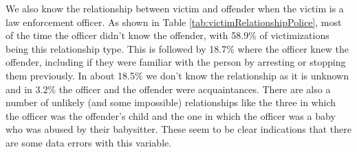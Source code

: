 \documentclass[
  12pt,
  openany]{book}
\begin{document}
We also know the relationship between victim and offender when the victim is a law enforcement officer. As shown in Table \ref{tab:victimRelationshipPolice}, most of the time the officer didn't know the offender, with 58.9\% of victimizations being this relationship type. This is followed by 18.7\% where the officer knew the offender, including if they were familiar with the person by arresting or stopping them previously. In about 18.5\% we don't know the relationship as it is unknown and in 3.2\% the officer and the offender were acquaintances. There are also a number of unlikely (and some impossible) relationships like the three in which the officer was the offender's child and the one in which the officer was a baby who was abused by their babysitter. These seem to be clear indications that there are some data errors with this variable.
\end{document}
